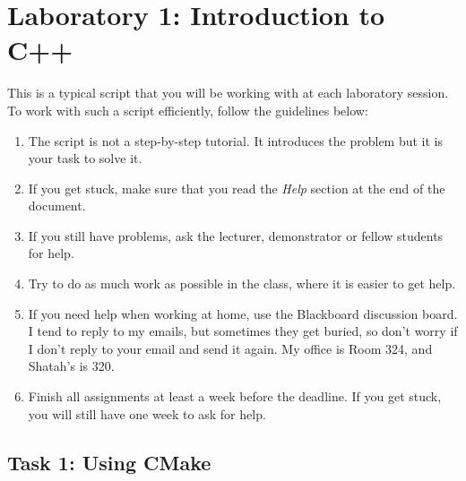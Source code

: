 
\section*{Laboratory 1: Introduction to C++}

This is a typical script that you will be working with at each
laboratory session. To work with such a script efficiently, follow the
guidelines below:
\begin{enumerate}
  \item The script is not a step-by-step tutorial. It introduces the
    problem but it is your task to solve it.

  \item If you get stuck, make sure that you read the \emph{Help} section
    at the end of the document.

  \item If you still have problems, ask the lecturer, demonstrator or
    fellow students for help.

  \item Try to do as much work as possible in the class, where it is
    easier to get help.
    
  \item If you need help when working at home, use the Blackboard
    discussion board. 
    I tend to reply to my emails, but sometimes they get buried, so don't worry if I don't reply to your email and send it again. 
    My office is Room 324, and Shatah's is 320.
    
  \item Finish all assignments at least a week before the deadline. 
  If you get stuck, you will still have one week to ask for help.
\end{enumerate}

\subsection*{Task 1: Using CMake}

